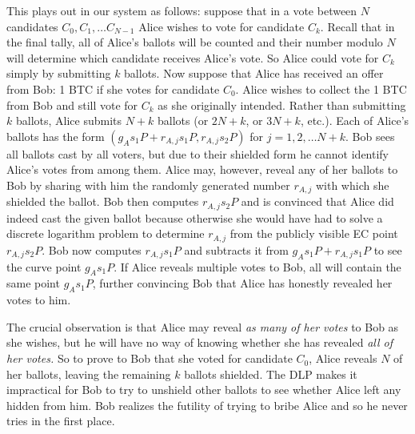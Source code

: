 \documentclass{article}
\begin{document}
This plays out in our system as follows: suppose that in a vote between $N$ candidates $C_0, C_1, \ldots C_{N-1}$ Alice wishes to vote for candidate $C_k$.  Recall that in the final tally, all of Alice's ballots will be counted and their number modulo $N$ will determine which candidate receives Alice's vote. So Alice could vote for $C_k$ simply by submitting $k$ ballots.  Now suppose that Alice has received an offer from Bob: 1 BTC if she votes for candidate $C_0$. Alice wishes to collect the 1 BTC from Bob and still vote for $C_k$ as she originally intended. Rather than submitting $k$ ballots, Alice submits $N+k$ ballots (or $2N+k$, or $3N+k$, etc.).  Each of Alice's ballots has the form $(g_A s_1 P + r_{A,j} s_1 P, r_{A,j} s_2 P)$ for $j=1,2, \ldots N+k$. Bob sees all ballots cast by all voters, but due to their shielded form he cannot identify Alice's votes from among them.  Alice may, however, reveal any of her ballots to Bob by sharing with him the randomly generated number $r_{A,j}$ with which she shielded the ballot.  Bob then computes $r_{A,j} s_2 P$ and is convinced that Alice did indeed cast the given ballot because otherwise she would have had to solve a discrete logarithm problem to determine $r_{A,j}$ from the publicly visible EC point $r_{A,j}s_2 P$.  Bob now computes $r_{A,j} s_1 P$ and subtracts it from $g_A s_1 P + r_{A,j} s_1 P$ to see the curve point $g_A s_1 P$.  If Alice reveals multiple votes to Bob, all will contain the same point $g_A s_1 P$, further convincing Bob that Alice has honestly revealed her votes to him.  

The crucial observation is that Alice may reveal \emph{as many of her votes} to Bob as she wishes, but he will have no way of knowing whether she has revealed \emph{all of her votes.}  So to prove to Bob that she voted for candidate $C_0$, Alice reveals $N$ of her ballots, leaving the remaining $k$ ballots shielded.  The DLP makes it impractical for Bob to try to unshield other ballots to see whether Alice left any hidden from him.  Bob realizes the futility of trying to bribe Alice and so he never tries in the first place.
\end{document}
